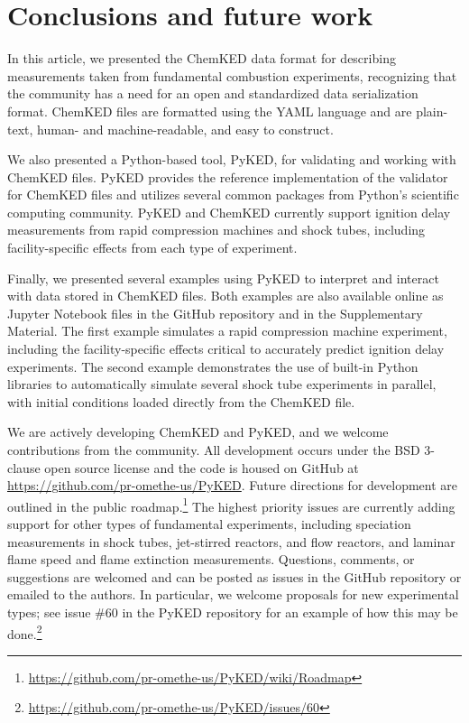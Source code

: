 \documentclass[12pt]{ijck}
\newcommand\ck{ChemKED}
\newcommand\pk{PyKED}
\begin{document}
\section{Conclusions and future work}

In this article, we presented the \ck{} data format for describing measurements
taken from fundamental combustion experiments, recognizing that the community
has a need for an open and standardized data serialization format. \ck{} files
are formatted using the YAML language and are plain-text, human- and
machine-readable, and easy to construct.

We also presented a Python-based tool, \pk{}, for validating and working
with \ck{} files. \pk{} provides the reference implementation of the validator
for \ck{} files and utilizes several common packages from Python's scientific
computing community. \pk{} and \ck{} currently support ignition delay
measurements from rapid compression machines and shock tubes, including
facility-specific effects from each type of experiment.

Finally, we presented several examples using \pk{} to interpret and interact with data
stored in \ck{} files. Both examples are also available online as Jupyter Notebook files in the
GitHub repository and in the Supplementary Material. The first example simulates a
rapid compression machine experiment, including the facility-specific effects critical to
accurately predict ignition delay experiments. The second example demonstrates the use of built-in
Python libraries to automatically simulate several shock tube experiments in parallel,
with initial conditions loaded directly from the \ck{} file.

We are actively developing \ck{} and \pk{}, and we welcome contributions from the community.
All development occurs under the BSD 3-clause open source license and the code is housed
on GitHub at \url{https://github.com/pr-omethe-us/PyKED}. Future directions for development are
outlined in the public roadmap.\footnote{\url{https://github.com/pr-omethe-us/PyKED/wiki/Roadmap}}
The highest priority issues are currently adding support for other types of fundamental experiments,
including speciation measurements in shock tubes, jet-stirred reactors, and flow reactors, and
laminar flame speed and flame extinction measurements. Questions, comments, or suggestions are
welcomed and can be posted as issues in the GitHub repository or emailed to the authors. In
particular, we welcome proposals for new experimental types; see issue \#60 in the \pk{} repository
for an example of how this may be
done.\footnote{\url{https://github.com/pr-omethe-us/PyKED/issues/60}}

\printbibliography
\end{document}
